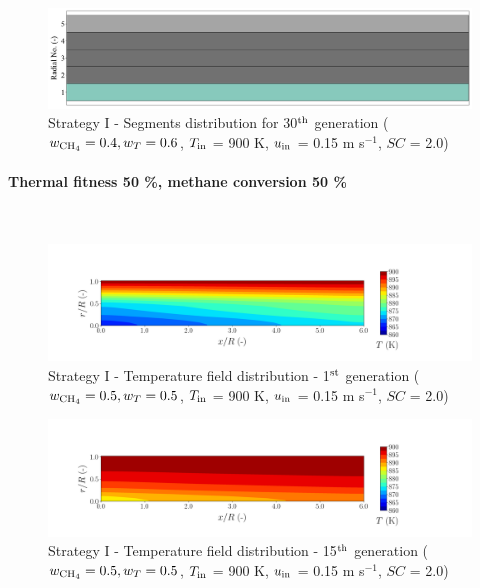 \documentclass[preprint,12pt]{elsarticle}
\begin{document}
\begin{figure}[h!]
\centering
\includegraphics[width=120mm]{results/segments/5seg/40C60T/seg.png}
\caption{\label{fig:30L6040G1-TField} Strategy I - Segments distribution for 30$^{\rm{th}}$ generation ($w_{\rm{CH_4}} = 0.4, w_T = 0.6$, $T_{\rm{in}}$ = 900 K, $u_{\rm{in}}$ = 0.15 m s$^{-1}$, $SC$ = 2.0)}
\end{figure}



\clearpage





\paragraph{Thermal fitness 50 \%, methane conversion 50 \%} \hspace{0pt} \\
\noindent 


\begin{figure}[h!]
\centering
\includegraphics[width=190mm]{results/5/50C_50T/GEN1-TFIELD.png}
\caption{\label{fig:5R5050G1-TField} Strategy I - Temperature field distribution - 1$^{\rm{st}}$ generation ($w_{\rm{CH_4}} = 0.5, w_T = 0.5$, $T_{\rm{in}}$ = 900 K, $u_{\rm{in}}$ = 0.15 m s$^{-1}$, $SC$ = 2.0)}
\end{figure}

\begin{figure}[h!]
\centering
\includegraphics[width=190mm]{results/5/50C_50T/GEN15-TFIELD.png}
\caption{\label{fig:5R5050G15-TField} Strategy I - Temperature field distribution - 15$^{\rm{th}}$ generation ($w_{\rm{CH_4}} = 0.5, w_T = 0.5$, $T_{\rm{in}}$ = 900 K, $u_{\rm{in}}$ = 0.15 m s$^{-1}$, $SC$ = 2.0)}
\end{figure}
\end{document}
